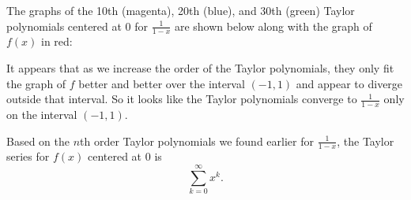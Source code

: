 \begin{activitySolution}
\item The graphs of the 10th (magenta), 20th (blue), and 30th (green) Taylor polynomials centered at 0 for $\frac{1}{1-x}$ are shown below along with the graph of $f(x)$ in red:
\begin{center}  \end{center}

It appears that as we increase the order of the Taylor polynomials, they only fit the graph of $f$ better and better over the interval $(-1,1)$ and appear to diverge outside that interval. So it looks like the Taylor polynomials converge to $\frac{1}{1-x}$ only on the interval $(-1,1)$.

Based on the $n$th order Taylor polynomials we found earlier for $\frac{1}{1-x}$, the Taylor series for $f(x)$ centered at 0 is
\[\sum_{k=0}^{\infty} x^k.\]
\ea
\end{activitySolution}
\aftera 